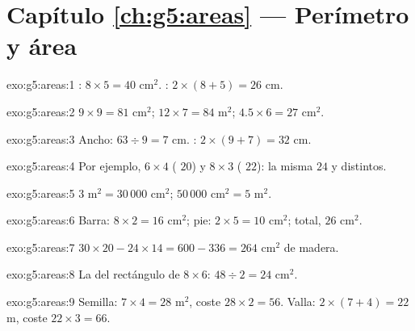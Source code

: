 \section*{Capítulo \ref{ch:g5:areas} --- Perímetro y área}

\begin{solution}{exo:g5:areas:1}
: $8 \times 5 = 40$ cm$^2$. :
$2 \times (8 + 5) = 26$ cm.
\end{solution}

\begin{solution}{exo:g5:areas:2}
$9 \times 9 = 81$ cm$^2$; \quad $12 \times 7 = 84$ m$^2$; \quad
$4.5 \times 6 = 27$ cm$^2$.
\end{solution}

\begin{solution}{exo:g5:areas:3}
Ancho: $63 \div 9 = 7$ cm. : $2 \times (9 + 7) = 32$ cm.
\end{solution}

\begin{solution}{exo:g5:areas:4}
Por ejemplo, $6 \times 4$ ( $20$) y $8 \times 3$
( $22$): la misma  $24$ y  distintos.
\end{solution}

\begin{solution}{exo:g5:areas:5}
$3$ m$^2 = 30\,000$ cm$^2$; \quad $50\,000$ cm$^2 = 5$ m$^2$.
\end{solution}

\begin{solution}{exo:g5:areas:6}
Barra: $8 \times 2 = 16$ cm$^2$; pie: $2 \times 5 = 10$ cm$^2$;
total, $26$ cm$^2$.
\end{solution}

\begin{solution}{exo:g5:areas:7}
$30 \times 20 - 24 \times 14 = 600 - 336 = 264$ cm$^2$ de madera.
\end{solution}

\begin{solution}{exo:g5:areas:8}
La  del rectángulo de $8 \times 6$: $48 \div 2 = 24$ cm$^2$.
\end{solution}

\begin{solution}{exo:g5:areas:9}
Semilla:  $7 \times 4 = 28$ m$^2$, coste $28 \times 2 = 56$.
Valla:  $2 \times (7 + 4) = 22$ m, coste
$22 \times 3 = 66$.
\end{solution}

